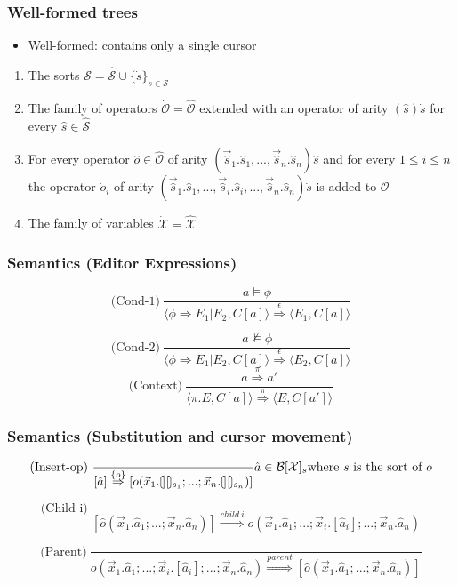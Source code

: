 \documentclass[t,24pt,aspectratio=169]{beamer}
\newcommand{\cleftsemicirc}{\put(3.5,2.5){\oval(5,10)[l]}\put(3.5,-2.5){\line(0,0){10}}\phantom{\circ}}
\newcommand{\crightsemicirc}{\put(1.5,2.5){\oval(5,10)[r]}\put(1.5,-2.5){\line(0,0){10}}\phantom{\circ}}
\newcommand{\hole}{\cleftsemicirc \crightsemicirc}
\begin{document}
\begin{frame}
    \frametitle{Well-formed trees}
    \begin{itemize}
        \item Well-formed: contains only a single cursor
    \end{itemize}
    \vspace{1cm}
    \begin{enumerate}
        \item The sorts $\dot{\mathcal{S}} = \hat{\mathcal{S}} \cup \{ \dot{s} \}_{s \in \mathcal{S}}$
        \item The family of operators $\dot{\mathcal{O}} = \hat{\mathcal{O}}$ extended with an operator of arity $(\hat{s})\dot{s}$ for every $\hat{s} \in \hat{\mathcal{S}}$
        \item For every operator $\hat{o} \in \hat{\mathcal{O}}$ of arity $(\vec{\hat{s}}_1.\hat{s}_1,...,\vec{\hat{s}}_n.\hat{s}_n)\hat{s}$ and for every $1 \leq i \leq n$ the operator $\dot{o}_i$ of arity $(\vec{\hat{s}}_1.\hat{s}_1,...,\vec{\hat{s}}_i.\hat{s}_i,...,\vec{\hat{s}}_n.\hat{s}_n)\dot{s}$ is added to $\dot{\mathcal{O}}$
        \item The family of variables $\dot{\mathcal{X}} = \hat{\mathcal{X}}$
    \end{enumerate}
\end{frame}

\begin{frame}
    \frametitle{Semantics (Editor Expressions)}

    \[
        \text{(Cond-1)} \ \frac{a \models \phi}{\langle \phi \Rightarrow E_1|E_2, C[a] \rangle \stackrel{\epsilon}{\Rightarrow} \langle E_1, C[a] \rangle}
    \]

    \[
        \text{(Cond-2)} \ \frac{a \not\models \phi}{\langle \phi \Rightarrow E_1|E_2, C[a] \rangle \stackrel{\epsilon}{\Rightarrow} \langle E_2, C[a] \rangle}
    \]
    \[
        \text{(Context)} \ \frac{a \stackrel{\pi}{\Rightarrow} a'}{\langle \pi.E,C[a] \rangle \stackrel{\pi}{\Rightarrow} \langle E,C[a'] \rangle}
    \]
\end{frame}

\begin{frame}
    \frametitle{Semantics (Substitution and cursor movement)}
    \[
        \text{(Insert-op)} \ \frac{}{[\hat{a}] \stackrel{\{ o \}}{\Rightarrow} [o(\vec{x}_1.\hole_{s_1};...;\vec{x}_n.\hole_{s_n})]} \hat{a} \in \mathcal{B}[\mathcal{X}]_s \text{where } s \text{ is the sort of } o
    \]

    \vspace{1cm}

    \[
        \text{(Child-i)} \ \frac{}{[\hat{o}(\vec{x}_1.\hat{a}_1;...;\vec{x}_n.\hat{a}_n)] \stackrel{child \ i}{\Rightarrow} o(\vec{x}_1.\hat{a}_1;...;\vec{x}_i.[\hat{a}_i];...;\vec{x}_n.\hat{a}_n)}
    \]

    \[
        \text{(Parent)} \ \frac{}{o(\vec{x}_1.\hat{a}_1;...;\vec{x}_i.[\hat{a}_i];...;\vec{x}_n.\hat{a}_n) \stackrel{parent}{\Rightarrow} [\hat{o}(\vec{x}_1.\hat{a}_1;...;\vec{x}_n.\hat{a}_n)]}
    \]
\end{frame}
\end{document}
